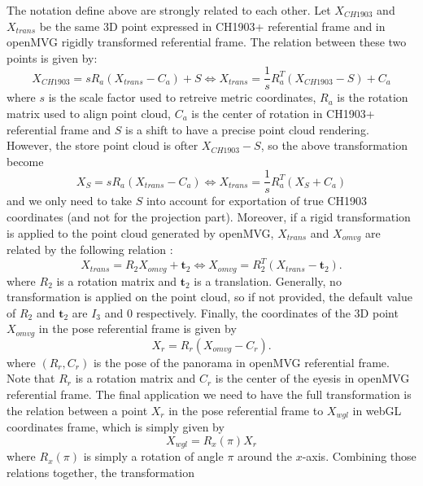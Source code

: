 \documentclass[a4paper, 11pt]{article}
\renewcommand{\t}{\mathbf{t}}
\begin{document}
   The notation define above are strongly related to each other. Let $X_{CH1903}$ and $X_{trans}$ be the same
   3D point expressed in CH1903+ referential frame and in openMVG rigidly transformed referential frame. The relation 
   between these two points is given by:
   \begin{equation}
       X_{CH1903}  = s R_a ( X_{trans} - C_a ) + S \Leftrightarrow X_{trans} = \frac{1}{s} R_a^T ( X_{CH1903} -S ) + C_a
   \end{equation}
   where $s$ is the scale factor used to retreive metric coordinates, $R_a$ is the rotation matrix used to align
   point cloud, $C_a$ is the center of rotation in CH1903+ referential frame and $S$ is a shift to have a precise
   point cloud rendering. However, the store point cloud is ofter $X_{CH1903}-S$, so the above transformation become
   \begin{equation}
       X_{S}  = s R_a ( X_{trans} - C_a ) \Leftrightarrow X_{trans} = \frac{1}{s} R_a^T ( X_{S} + C_a )
   \end{equation}
   and we only need to take $S$ into account for exportation of true CH1903 coordinates (and not for the projection part).
   Moreover, if a rigid transformation is applied to the point cloud generated by openMVG, 
   $X_{trans}$ and $X_{omvg}$ are related by the following relation :
   \begin{equation}
       X_{trans} = R_2 X_{omvg} + \t_2 \Leftrightarrow X_{omvg} = R_2^T (X_{trans} - \t_2).
   \end{equation}
   where $R_2$ is a rotation matrix and $\t_2$ is a translation. Generally, no transformation is applied on the point
   cloud, so if not provided, the default value of $R_2$ and $\t_2$ are $I_3$ and $0$ respectively. 
   Finally, the coordinates of the 3D point $X_{omvg}$ in the pose referential frame is given by
   \begin{equation}
       X_r = R_r (X_{omvg}-C_r).
   \end{equation}
   where $(R_r, C_r)$ is the pose of the panorama in openMVG referential frame. 
   Note that $R_r$ is a rotation matrix and $C_r$ is the center of the eyesis in openMVG referential frame. 
   The final application we need to have the full transformation is the relation between a point $X_r$ in the pose referential 
   frame to $X_{wgl}$ in webGL coordinates frame, which is simply given by
   \begin{equation}
       X_{wgl} = R_x(\pi) X_r
   \end{equation}
   where $R_x(\pi)$ is simply a rotation of angle $\pi$ around the $x$-axis. Combining those relations together, the transformation 
\end{document}
